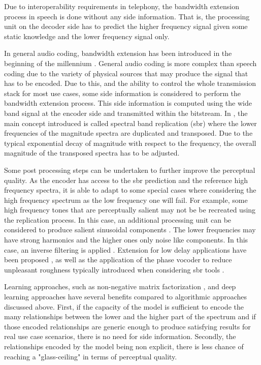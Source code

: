 \documentclass{article}
\begin{document}
Due to interoperability requirements in telephony, the bandwidth extension process in speech is done without any side information. That is, the processing unit on the decoder side has to predict the higher frequency signal given some static knowledge and the lower frequency signal only.

In general audio coding, bandwidth extension has been introduced in the beginning of the millennium \cite{dietz2002spectral}. General audio coding is more complex than speech coding due to the variety of physical sources that may produce the signal that has to be encoded. Due to this, and the ability to control the whole transmission stack for most use cases, some side information is considered to perform the bandwidth extension process. This side information is computed using the wide band signal at the encoder side and transmitted within the bitstream. In \cite{dietz2002spectral}, the main concept introduced is called spectral band replication (sbr) where the lower frequencies of the magnitude spectra are duplicated and transposed. Due to the typical exponential decay of magnitude with respect to the frequency, the overall magnitude of the transposed spectra has to be adjusted.

Some post processing steps can be undertaken to further improve the perceptual quality. As the encoder has access to the sbr prediction and the reference high frequency spectra, it is able to adapt to some special cases where considering the high frequency spectrum as the low frequency one will fail. For example, some high frequency tones that are perceptually salient may not be be recreated using the replication process. In this case, an additional processing unit can be considered to produce salient sinusoidal components \cite{ekstrand2002bandwidth}. The lower frequencies may have strong harmonics and the higher ones only noise like components. In this case, an inverse filtering is applied \cite{ehret2004audio}. Extension for low delay applications have been proposed \cite{friedrich2007spectral}, as well as the application of the phase vocoder \cite{flanagan1966phase} to reduce unpleasant roughness typically introduced when considering sbr tools \cite{nagel2009harmonic}.

Learning approaches, such as non-negative matrix factorization \cite{sun2013non}, and deep learning approaches \cite{miron2018high} have several benefits compared to algorithmic approaches discussed above. First, if the capacity of the model is sufficient to encode the many relationships between the lower and the higher part of the spectrum and if those encoded relationships are generic enough to produce satisfying results for real use case scenarios, there is no need for side information. Secondly, the relationships encoded by the model being non explicit, there is less chance of reaching a "glass-ceiling" in terms of perceptual quality.
\end{document}
